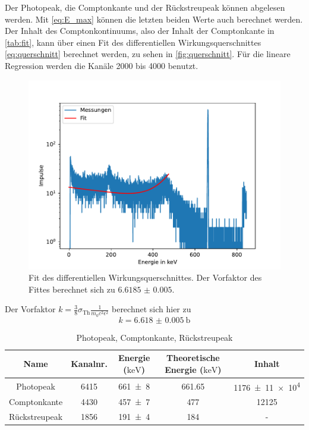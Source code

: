 Der Photopeak, die Comptonkante und der Rückstreupeak können abgelesen werden. Mit \autoref{eq:E_max} können die letzten beiden Werte auch berechnet werden.
Der Inhalt des Comptonkontinuums, also der Inhalt der Comptonkante in \autoref{tab:fit}, kann über einen Fit des differentiellen Wirkungsquerschnittes \eqref{eq:querschnitt} berechnet werden, zu sehen in \autoref{fig:querschnitt}.
Für die lineare Regression werden die Kanäle 2000 bis 4000 benutzt.

\begin{figure}[H]
    \centering
    \includegraphics[width=\textwidth]{plots/querschnitt.pdf}
    \caption{Fit des differentiellen Wirkungsquerschnittes. Der Vorfaktor des Fittes berechnet sich zu $\num{6.6185(50)}$.}
    \label{fig:querschnitt}
\end{figure}

Der Vorfaktor $k = \frac{3}{8} \sigma_\text{Th} \frac{1}{m_0 c^2 \epsilon^2}$ berechnet sich hier zu
\begin{equation}
    k = \qty{6.618(5)}{\barn}
\end{equation}

\begin{table}[H]
    \centering
    \caption{Photopeak, Comptonkante, Rückstreupeak}
    \label{tab:fit}
    \begin{tabular}{c c c c c}
        \toprule
        {Name} & {Kanalnr.} & {Energie ($\si{\kilo\electronvolt}$)} & Theoretische Energie ($\si{\kilo\electronvolt}$) & Inhalt \\
        \midrule
        {Photopeak} & 6415 & \num{661(8)} & 661.65 & \num{1176(11)e4} \\
        {Comptonkante} & 4430 & \num{457(7)} & 477 & 12125 \\
        {Rückstreupeak} & 1856 & \num{191(4)} & 184 & {-} \\
        \bottomrule
    \end{tabular}
\end{table}


